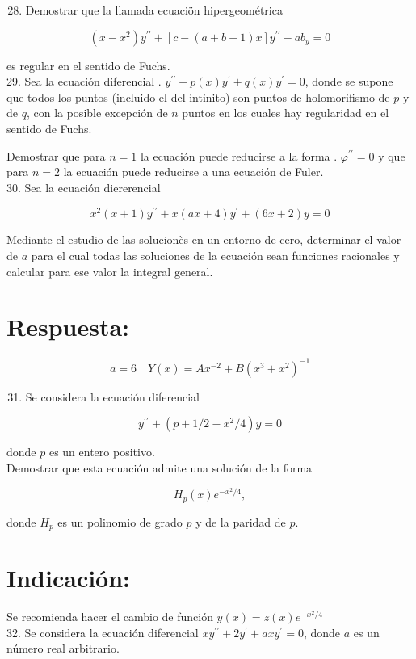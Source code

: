 \documentclass[10pt]{article}
\theoremstyle{plain}
\theoremstyle{definition}
\theoremstyle{remark}
\begin{document}
\begin{enumerate}
  \setcounter{enumi}{27}
  \item Demostrar que la llamada ecuaciön hipergeométrica
\end{enumerate}

$$
\left(x-x^{2}\right) y^{\prime \prime}+[c-(a+b+1) x] y^{\prime \prime}-a b_{y}=0
$$

es regular en el sentido de Fuchs.\\
29. Sea la ecuación diferencial . $y^{\prime \prime}+p(x) y^{\prime}+q(x) y^{\prime}=0$, donde se supone que todos los puntos (incluido el del intinito) son puntos de holomorifismo de $p$ y de $q$, con la posible excepción de $n$ puntos en los cuales hay regularidad en el sentido de Fuchs.

Demostrar que para $n=1$ la ecuación puede reducirse a la forma . $\varphi^{\prime \prime}=0$ y que para $n=2$ la ecuación puede reducirse a una ecuación de Fuler.\\
30. Sea la ecuación diererencial

$$
x^{2}(x+1) y^{\prime \prime}+x(a x+4) y^{\prime}+(6 x+2) y=0
$$

Mediante el estudio de las solucionès en un entorno de cero, determinar el valor de $a$ para el cual todas las soluciones de la ecuación sean funciones racionales y calcular para ese valor la integral general.

\section*{Respuesta:}
$$
a=6 \quad Y(x)=A x^{-2}+B\left(x^{3}+x^{2}\right)^{-1}
$$

\begin{enumerate}
  \setcounter{enumi}{30}
  \item Se considera la ecuación diferencial
\end{enumerate}

$$
y^{\prime \prime}+\left(p+1 / 2-x^{2} / 4\right) y=0
$$

donde $p$ es un entero positivo.\\
Demostrar que esta ecuación admite una solución de la forma

$$
H_{p}(x) e^{-x^{2} / 4},
$$

donde $H_{p}$ es un polinomio de grado $p$ y de la paridad de $p$.

\section*{Indicación:}
Se recomienda hacer el cambio de función $y(x)=z(x) e^{-x^{2} / 4}$\\
32. Se considera la ecuación diferencial $x y^{\prime \prime}+2 y^{\prime}+a x y^{\prime}=0$, donde $a$ es un número real arbitrario.
\end{document}
